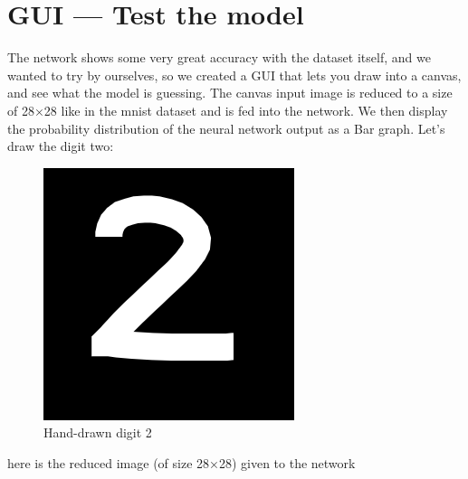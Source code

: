 \documentclass[a4paper, twocolumn, twoside]{article}
\begin{document}
	\section{GUI — Test the model}
	The network shows some very great accuracy with the dataset itself, and we wanted to try by ourselves,
	so we created a GUI that lets you draw into a canvas, and see what the model is guessing.
	The canvas input image is reduced to a size of 28×28 like in the mnist dataset and is fed into the network.
	We then display the probability distribution of the neural network output as a Bar graph.
	Let's draw the digit two:
	\begin{figure}[H]
		\begin{center}
			\includegraphics[width=\columnwidth]{images/2_original.png}
		\end{center}
		\caption{Hand-drawn digit 2}\label{fig:2_original}
	\end{figure}
	here is the reduced image (of size 28×28) given to the network
\end{document}
